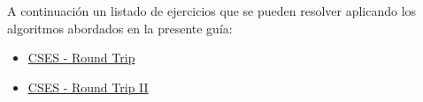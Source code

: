 A continuación un listado de ejercicios que se pueden resolver aplicando los algoritmos abordados en la presente guía:

\begin{itemize}
	\item \href{https://cses.fi/problemset/task/1669}{CSES - Round Trip}
	\item \href{https://cses.fi/problemset/task/1678}{CSES - Round Trip II}
\end{itemize}
